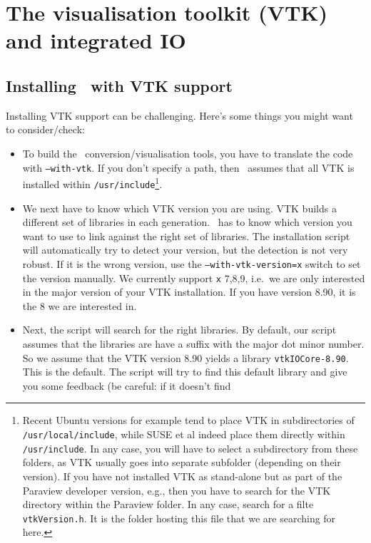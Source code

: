 \chapter{The visualisation toolkit (VTK) and integrated IO}
\label{chapter:vtk}

\section{Installing \Peano\ with VTK support}
Installing VTK support can be challenging. 
Here's some things you might want to consider/check:

\begin{itemize}
  \item To build the \Peano\ conversion/visualisation tools, you have to
  translate the code with \texttt{--with-vtk}. If you don't
  specify a path, then \Peano\ assumes that all VTK is installed 
  within \texttt{/usr/include}\footnote{Recent Ubuntu
  versions for example tend to place VTK in subdirectories of
  \texttt{/usr/local/include}, while SUSE et al indeed place them directly
  within \texttt{/usr/include}. In any case, you will have to select a
  subdirectory from these folders, as VTK usually goes into separate subfolder (depending on their
  version). If you have not installed VTK as stand-alone but as part of the
  Paraview developer version, e.g., then you have to search for the VTK
  directory within the Paraview folder. In any case, search for a
  filte \texttt{vtkVersion.h}. It is the folder hosting this file that we are
  searching for here.}.
  \item We next have to know which VTK version you are using. VTK builds a
  different set of libraries in each generation. \Peano\ has to know which
  version you want to use to link against the right set of libraries. The
  installation script will automatically try to detect your version, but the
  detection is not very robust. If it is the wrong version, use the
  \texttt{--with-vtk-version=x} switch to set the version manually. We currently
  support \texttt{x} 7,8,9, i.e.~we are only interested in the major version of
  your VTK installation. If you have version 8.90, it is the 8 we are interested
  in.
  \item Next, the script will search for the right libraries. By default, our
  script assumes that the libraries are have a suffix with the major dot minor
  number. So we assume that the VTK version 8.90 yields a library
  \texttt{vtkIOCore-8.90}. This is the default. The script will try to find this
  default library and give you some feedback (be careful: if it doesn't find

\end{itemize}
